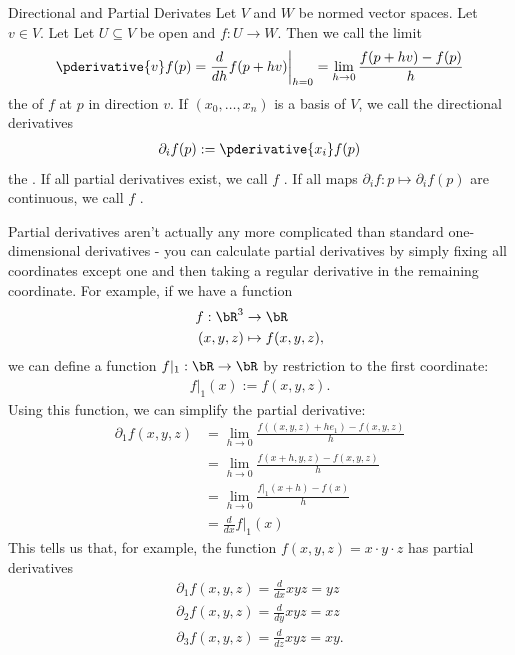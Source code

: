 \begin{importantdefinition}{Directional and Partial Derivates}{}
	Let $V$ and $W$ be normed vector spaces. Let $v \in V$. Let Let $U \subseteq V$ be open and $f : U \to W$. Then we call the limit
	\begin{align*}
		\pderivative{v} f(p) = \frac{d}{dh} f(p + hv) \bigg |_{h = 0} = \lim_{h \to 0} \frac{f(p + hv) - f(p)}{h}
	\end{align*}
	the  of $f$ at $p$ in direction $v$. If $(x_0, \hdots, x_n)$ is a basis of $V$, we call the directional derivatives
	\begin{align*}
		\partial_i f(p) := \pderivative{x_i} f(p) 
	\end{align*}
	the . If all partial derivatives exist, we call $f$ . If all maps $\partial_i f : p \mapsto \partial_if(p)$ are continuous, we call $f$ .
\end{importantdefinition}
Partial derivatives aren't actually any more complicated than standard one-dimensional derivatives - you can calculate partial derivatives by simply fixing all coordinates except one and then taking a regular derivative in the remaining coordinate. For example, if we have a function
\begin{align*}
	f : \bR^3 &\to \bR\\
		(x,y,z) &\mapsto f(x,y,z),
\end{align*}
we can define a function $f|_1 : \bR \to \bR$ by restriction to the first coordinate:
\begin{align*}
	f|_1(x) := f(x,y,z).
\end{align*}
Using this function, we can simplify the partial derivative:
\begin{align*}
	\partial_1 f(x,y,z) 
	&= \lim_{h \to 0} \frac{f((x,y,z) + he_1) - f(x,y,z)}{h}\\
	&= \lim_{h \to 0} \frac{f(x+h,y,z) - f(x,y,z)}{h}\\
	&= \lim_{h \to 0} \frac{f|_1(x+h) - f(x)}{h}\\
	&= \frac{d}{dx} f|_1(x)
\end{align*}
This tells us that, for example, the function $f(x,y,z) = x \cdot y \cdot z$ has partial derivatives
\begin{align*}
	\partial_1 f(x,y,z) = \frac{d}{dx} xyz = yz\\
	\partial_2 f(x,y,z) = \frac{d}{dy} xyz = xz\\
	\partial_3 f(x,y,z) = \frac{d}{dz} xyz = xy.\\
\end{align*}
